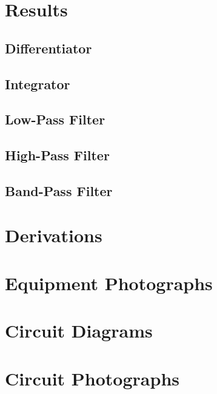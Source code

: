 \documentclass[twocolumn,english]{IEEEtran}
\theoremstyle{plain}
\theoremstyle{plain}
\begin{document}
\section{Results}
	\subsection{Differentiator}
	\subsection{Integrator}
	\subsection{Low-Pass Filter}
	\subsection{High-Pass Filter}
	\subsection{Band-Pass Filter}

\appendices{}

\section{Derivations}
\section{Equipment Photographs}
\section{Circuit Diagrams}
\section{Circuit Photographs}


%
%
\end{document}
